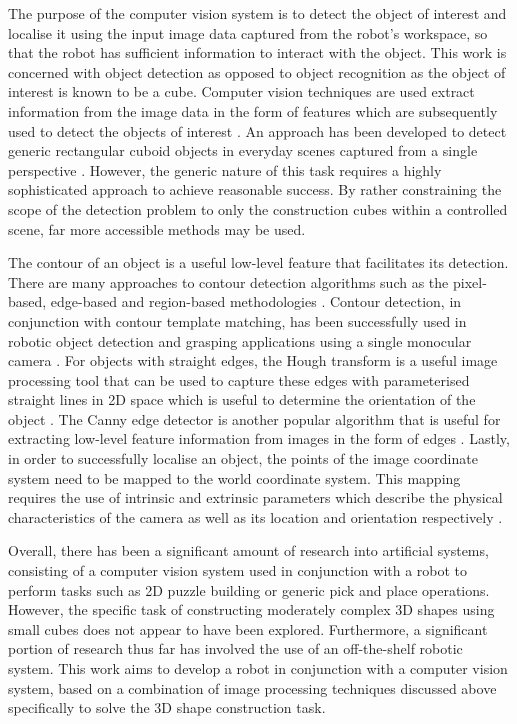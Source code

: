 The purpose of the computer vision system is to detect the object of interest and localise it using the input image data captured from the robot's workspace, so that the robot has sufficient information to interact with the object. This work is concerned with object detection as opposed to object recognition as the object of interest is known to be a cube. Computer vision techniques are used extract information from the image data in the form of features which are subsequently used to detect the objects of interest \cite{Kumar:Visual_Servoing}. An approach has been developed to detect generic rectangular cuboid objects in everyday scenes captured from a single perspective \cite{Xiao:Localizing_3D_Cuboids}. However, the generic nature of this task requires a highly sophisticated approach to achieve reasonable success. By rather constraining the scope of the detection problem to only the construction cubes within a controlled scene, far more accessible methods may be used. 

The contour of an object is a useful low-level feature that facilitates its detection. There are many approaches to contour detection algorithms such as the pixel-based, edge-based and region-based methodologies \cite{Gong2018:Overview_of_Contour_Detection_Approaches}. Contour detection, in conjunction with contour template matching, has been successfully used in robotic object detection and grasping applications using a single monocular camera \cite{Wei:Robotic_Object_Recognition_With_Natural_Background}. For objects with straight edges, the Hough transform is a useful image processing tool that can be used to capture these edges with parameterised straight lines in 2D space which is useful to determine the orientation of the object \cite{Aggarwal:Line_Detection_Hough_Transform}. The Canny edge detector is another popular algorithm that is useful for extracting low-level feature information from images in the form of edges \cite{Canny:Computational_Edge_Detection}. Lastly, in order to successfully localise an object, the points of the image coordinate system need to be mapped to the world coordinate system. This mapping requires the use of intrinsic and extrinsic parameters which describe the physical characteristics of the camera as well as its location and orientation respectively \cite{Szeliski:Computer_Vision_Algorithms_and_Applications}.

Overall, there has been a significant amount of research into artificial systems, consisting of a computer vision system used in conjunction with a robot to perform tasks such as 2D puzzle building or generic pick and place operations. However, the specific task of constructing moderately complex 3D shapes using small cubes does not appear to have been explored. Furthermore, a significant portion of research thus far has involved the use of an off-the-shelf robotic system. This work aims to develop a robot in conjunction with a computer vision system, based on a combination of image processing techniques discussed above specifically to solve the 3D shape construction task.


